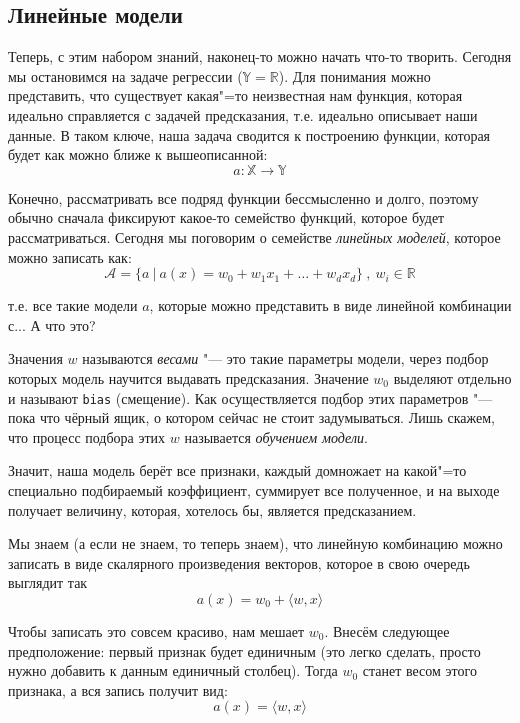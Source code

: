 \subsection*{Линейные модели}

Теперь, с этим набором знаний, наконец-то можно начать что-то творить. Сегодня мы остановимся на задаче регрессии ($\mathbb{Y} = \mathbb{R}$). Для понимания можно представить, что существует какая"=то неизвестная нам функция, которая идеально справляется с задачей предсказания, т.е. идеально описывает наши данные. В таком ключе, наша задача сводится к построению функции, которая будет как можно ближе к вышеописанной:
\begin{equation*}
a: \mathbb{X} \rightarrow \mathbb{Y}
\end{equation*}

Конечно, рассматривать все подряд функции бессмысленно и долго, поэтому обычно сначала фиксируют какое-то семейство функций, которое будет рассматриваться. Сегодня мы поговорим о семействе \textit{линейных моделей}, которое можно записать как:
\begin{equation*}
\mathcal{A} = \{a ~|~ a(x) = w_0 + w_1x_1 + \dots + w_dx_d\}~,~w_i \in \mathbb{R}
\end{equation*}

т.е. все такие модели $a$, которые можно представить в виде линейной комбинации с... А что это?

Значения $w$ называются \textit{весами} "--- это такие параметры модели, через подбор которых модель научится выдавать предсказания. Значение $w_0$ выделяют отдельно и называют \texttt{bias} (смещение). Как осуществляется подбор этих параметров "--- пока что чёрный ящик, о котором сейчас не стоит задумываться. Лишь скажем, что процесс подбора этих $w$ называется \textit{обучением модели}.

Значит, наша модель берёт все признаки, каждый домножает на какой"=то специально подбираемый коэффициент, суммирует все полученное, и на выходе получает величину, которая, хотелось бы, является предсказанием.

Мы знаем (а если не знаем, то теперь знаем), что линейную комбинацию можно записать в виде скалярного произведения векторов, которое в свою очередь выглядит так
\begin{equation*}
a(x) = w_0 + \langle w, x \rangle
\end{equation*}

Чтобы записать это совсем красиво, нам мешает $w_0$. Внесём следующее предположение: первый признак будет единичным (это легко сделать, просто нужно добавить к данным единичный столбец). Тогда $w_0$ станет весом этого признака, а вся запись получит вид:
\begin{equation*}
a(x) = \langle w, x \rangle
\end{equation*}

